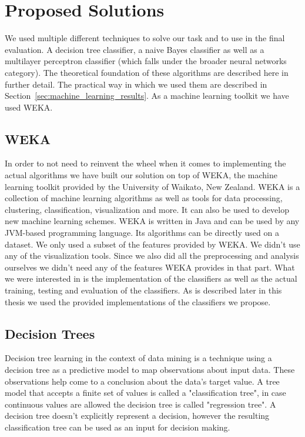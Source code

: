 \section{Proposed Solutions}
\label{sec:proposed_solution}
We used multiple different techniques to solve our task and to use in the final evaluation. A decision tree classifier, a naive Bayes classifier as well as a multilayer perceptron classifier (which falls under the broader neural networks category). The theoretical foundation of these algorithms are described here in further detail. The practical way in which we used them are described in Section~\ref{sec:machine_learning_results}. As a machine learning toolkit we have used WEKA.

\subsection{WEKA}
\label{subsection:WEKA}
In order to not need to reinvent the wheel when it comes to implementing the actual algorithms we have built our solution on top of WEKA, the machine learning toolkit provided by the University of Waikato, New Zealand. WEKA is a collection of machine learning algorithms as well as tools for data processing, clustering, classification, visualization and more. It can also be used to develop new machine learning schemes. WEKA is written in Java and can be used by any JVM-based programming language. Its algorithms can be directly used on a dataset. We only used a subset of the features provided by WEKA. We didn't use any of the visualization tools. Since we also did all the preprocessing and analysis ourselves we didn't need any of the features WEKA provides in that part. What we were interested in is the implementation of the classifiers as well as the actual training, testing and evaluation of the classifiers. As is described later in this thesis we used the provided implementations of the classifiers we propose. 

\subsection{Decision Trees}
Decision tree learning in the context of data mining is a technique using a decision tree as a predictive model to map observations about input data. These observations help come to a conclusion about the data's target value. A tree model that accepts a finite set of values is called a "classification tree", in case continuous values are allowed the decision tree is called "regression tree". A decision tree doesn't explicitly represent a decision, however the resulting classification tree can be used as an input for decision making. \cite{DataMining}

